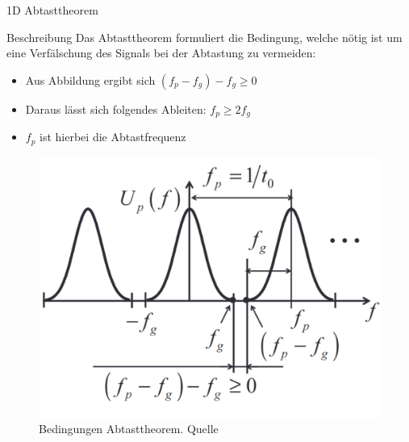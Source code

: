 \documentclass{beamer}
\begin{document}
	\begin{frame}{1D Abtasttheorem}
	\begin{block}{Beschreibung}
		Das Abtasttheorem formuliert die Bedingung, welche nötig ist um eine Verfälschung des Signals bei der Abtastung zu vermeiden:
	\end{block}
	\begin{multicols}{2}
		
	
	\begin{itemize}
		\item Aus Abbildung ergibt sich $(f_p-f_g)-f_g \ge 0$
		\item Daraus lässt sich folgendes Ableiten: $f_p \ge 2f_g$
		\item $f_p$ ist hierbei die Abtastfrequenz 
	\end{itemize}
	
	\begin{figure}
		\includegraphics[width=0.58\textheight]{abtasttheorem.pdf}
		\caption{\footnotesize Bedingungen Abtasttheorem. Quelle\cite{lange}}
	\end{figure}
	\end{multicols}
	\end{frame}
\end{document}
